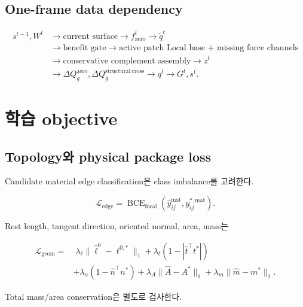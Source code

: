 \documentclass[11pt,a4paper]{article}
\begin{document}
\subsection{One-frame data dependency}

\begin{equation}
\boxed{
\begin{aligned}
s^{t-1},W^t
&\rightarrow
\text{current surface}
\rightarrow
f_{\mathrm{aero}}^t
\rightarrow
\widetilde q^t\\
&\rightarrow
\text{benefit gate}
\rightarrow
\text{active patch Local base + missing force channels}\\
&\rightarrow
\text{conservative complement assembly}
\rightarrow
z^t\\
&\rightarrow
\Delta Q_g^{\mathrm{aero}},\Delta Q_g^{\mathrm{structural\ cross}}
\rightarrow
q^t
\rightarrow
G^t,s^t.
\end{aligned}
}
\end{equation}

\section{학습 objective}

\subsection{Topology와 physical package loss}

Candidate material edge classification은 class imbalance를 고려한다.

\begin{equation}
  \mathcal L_{\mathrm{edge}}
  =
  \operatorname{BCE}_{\mathrm{focal}}
  (\widehat y_{ij}^{\mathrm{mat}},y_{ij}^{*,\mathrm{mat}}).
\end{equation}

Rest length, tangent direction, oriented normal, area, mass는

\begin{equation}
\begin{aligned}
  \mathcal L_{\mathrm{geom}}
  =&\;
  \lambda_\ell\|\widehat\ell^0-\ell^{0,*}\|_1
  +\lambda_t(1-|\widehat t^\top t^*|)\\
  &+\lambda_n(1-\widehat n^\top n^*)
  +\lambda_A\|\widehat A-A^*\|_1
  +\lambda_m\|\widehat m-m^*\|_1.
\end{aligned}
\end{equation}

Total mass/area conservation은 별도로 검사한다.
\end{document}

